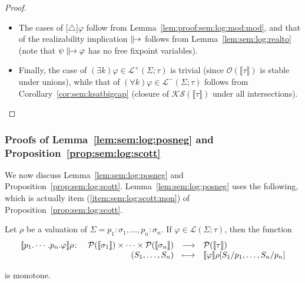 \documentclass[%
  a4paper,
  UKenglish,
  cleveref,
  autoref,
  thm-restate,
  numberwithinsect,
]{lipics-v2021}
\newcommand\longto\longrightarrow
\newcommand\Po{\mathcal{P}}		%
\newcommand\I[1]{\llbracket #1 \rrbracket} %
\newcommand\SP{S}			%
\newcommand\Open{\mathcal{O}}		%
\newcommand\K{\mathcal{K}}		%
\newcommand\Sat{\mathcal{S}}		%
\newcommand\val{\rho}	%
\newcommand\defrealto{\mathrel\parallel\joinrel\to}
\newcommand\realto{\mathrel{\defrealto}}
\newcommand\PT{\tau}		%
\newcommand\PTbis{\sigma}	%
\newcommand\itvar{k}
\newcommand\FP{p}
\newcommand\FPEnv{\Sigma}
\newcommand\Lang{\mathcal{L}}
\newcommand\form[1]{\lbrack #1 \rbrack}
\newcommand\modgen{\mathord{\triangle}}	%
\begin{document}
\begin{proof}
\begin{itemize}
\item
The cases of $\form\modgen\varphi$ follow from Lemma~\ref{lem:proof:sem:log:mod:mod},
and that of the realizability implication $\realto$ 
follows from Lemma~\ref{lem:sem:log:realto}
(note that $\psi \realto \varphi$ has no free fixpoint variables).

\item
Finally, the case of $(\exists \itvar)\varphi \in \Lang^+(\FPEnv;\PT)$
is trivial (since $\Open(\I\PT)$ is stable under unions),
while that of $(\forall \itvar)\varphi \in \Lang^-(\FPEnv;\PT)$
follows from Corollary~\ref{cor:sem:ksatbigcap}
(closure of $\K\Sat(\I\PT)$ under all intersections).
\qedhere
\end{itemize}
\end{proof}




\subsubsection{Proofs of Lemma~\ref{lem:sem:log:posneg}
and Proposition~\ref{prop:sem:log:scott}}



We now discuss Lemma~\ref{lem:sem:log:posneg}
and Proposition~\ref{prop:sem:log:scott}.
Lemma~\ref{lem:sem:log:posneg} uses the following,
which is actually item (\ref{item:sem:log:scott:mon})
of Proposition~\ref{prop:sem:log:scott}.

\begin{lemma}
\label{lem:proof:sem:log:form:mon}
Let $\val$ be a valuation of
$\FPEnv = \FP_1\colon \PTbis_1, \dots, \FP_n\colon \PTbis_n$.
%
If $\varphi \in \Lang(\FPEnv;\PT)$,
then the function
\[
\begin{array}{l r c l}
  \I{\FP_1.\cdots.\FP_n.\varphi}\val \colon
& \Po(\I{\PTbis_1}) \times \dots \times \Po(\I{\PTbis_n})
& \longto
& \Po(\I{\PT})
\\
%
& (\SP_1,\dots,\SP_n)
& \longmapsto
& \I{\varphi}\val[\SP_1 / \FP_1, \dots, \SP_n / \FP_n]
\end{array}
\]

\noindent
is monotone.
\end{lemma}
\end{document}
